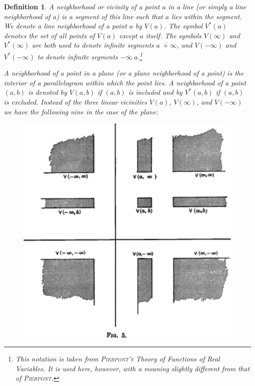 \documentclass[a4paper,12pt]{book}[2004/02/16]
\providecommand{\colorbox}[2]{#2}
\newcommand{\correction}[2]{\colorbox{corr}{#1}}
\providecommand{\hypertarget}[2]{#2}
\theoremstyle{ilemma}
\theoremstyle{itheorem}
\theoremstyle{iother}
\theoremstyle{icorollary}
\theoremstyle{numcorollary}
\theoremstyle{idefinition}
\newtheorem*{definition}{Definition}
\begin{document}
\begin{definition}
A \emph{neighborhood} or \emph{vicinity} of a point $a$ in a line (or
simply a line neighborhood of $a$) is a segment of this line such that
$a$ lies within the segment. We denote a line neighborhood
of a point $a$ by $V(a)$. The symbol $V^*(a)$ denotes the set of all
points of $V(a)$ except $a$ itself. The symbols $V(\infty)$ and
$V^*(\infty)$ are both used to denote infinite segments $\overline{a\
+\infty}$, and $V(-\infty)$ and $V^*(-\infty)$ to denote infinite
segments $\overline{-\infty\ a}$.\footnote{%
This notation is taken
from \textsc{Pierpont's} \textit{Theory of Functions of Real
Variables}. It is used here, however, with a meaning slightly
different from that of \textsc{Pierpont}.}

A neighborhood of a point in a plane (or a plane neighborhood of a
point) is the interior of a parallelogram within which the point
lies. A neighborhood of a point $(a,b)$ is denoted by $V(a,b)$ if
$(a,b)$ is included and by $V^*(a,b)$ if $(a,b)$ is excluded.  Instead
of the three linear vicinities $V(a)$, $V(\infty)$, and $V(-\infty)$
we have the following nine in the case of the plane:

\begin{figure}[!hbtp]\label{fig05}\hypertarget{fig05}{}
\centering
\includegraphics{images/fig05}
\end{figure}
\end{definition}
\end{document}
